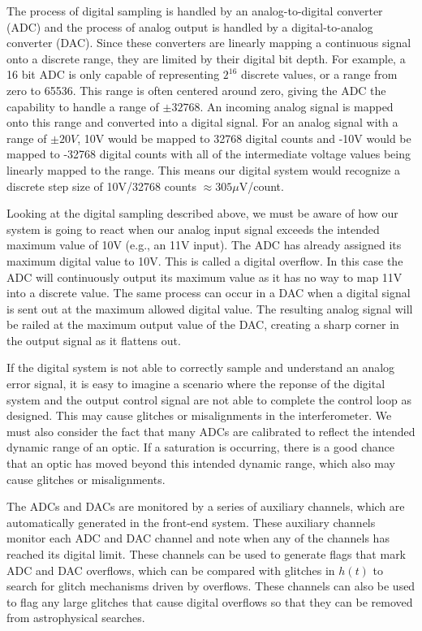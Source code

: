The process of digital sampling is handled by an analog-to-digital 
converter (ADC) and the process of analog output is handled by a 
digital-to-analog converter (DAC).  Since these converters are linearly 
mapping a continuous signal onto a discrete range, they are limited by 
their digital bit depth.  For example, a 16 bit ADC is only capable of 
representing $2^{16}$ discrete values, or a range from zero to 65536.  
This range is often centered around zero, giving the ADC the capability 
to handle a range of $\pm32768$.  An incoming analog signal is mapped 
onto this range and converted into a digital signal.
For an analog signal with a range of $\pm20V$, 
10V would be mapped to 32768 digital counts and -10V would be mapped 
to -32768 digital counts with all 
of the intermediate voltage values being linearly mapped to the range. This 
means our digital system would recognize a discrete step size of 
10V/32768 counts $\approx 305 \mu $V/count.

Looking at the digital sampling described above, we must be aware of how our system 
is going to react when our analog input signal exceeds the intended maximum 
value of 10V (e.g., an 11V input). The ADC has already assigned its maximum 
digital value to 10V. This is called a digital overflow. In this case the ADC 
will continuously output its maximum value as it has no way to map 11V into 
a discrete value. The same process can occur in a DAC when a digital signal 
is sent out at the maximum allowed digital value. The resulting analog signal 
will be railed at the maximum output value of the DAC, creating a sharp corner 
in the output signal as it flattens out. 

If the digital system is not able to correctly sample and understand an analog 
error signal, it is easy to imagine a scenario where the reponse of the digital 
system and the output control signal are not able to complete the control loop 
as designed. This may cause glitches or misalignments in the interferometer.
We must also consider the fact that many ADCs are calibrated to reflect the 
intended dynamic range of an optic.  If a saturation is occurring, there is 
a good chance that an optic has moved beyond this intended dynamic range, which 
also may cause glitches or misalignments.

The ADCs and DACs are monitored by a series of auxiliary channels, which are 
automatically generated in the front-end system. These auxiliary channels 
monitor each ADC and DAC channel and note when any of the channels has reached 
its digital limit. These channels can be used to generate flags that mark 
ADC and DAC overflows, which can be compared with glitches in $h(t)$ to 
search for glitch mechanisms driven by overflows. These channels can also 
be used to flag any large glitches that cause digital overflows so that they 
can be removed from astrophysical searches. 

